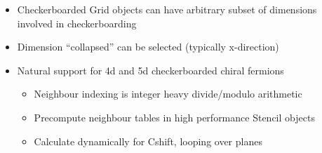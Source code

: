 \documentclass[pdf,ps,8pt]{beamer}
\begin{document}
\begin{frame}[fragile]
\begin{center}
\end{center}
\begin{itemize}
\item Checkerboarded Grid objects can have arbitrary subset of dimensions involved in checkerboarding
\item Dimension ``collapsed'' can be selected (typically x-direction)
\item Natural support for 4d and 5d checkerboarded chiral fermions  
\begin{itemize}
  \item Neighbour indexing is integer heavy divide/modulo arithmetic
  \item Precompute neighbour tables in high performance Stencil objects
  \item Calculate dynamically for Cshift, looping over planes
\end{itemize}
\end{itemize}
\end{frame}
\end{document}

